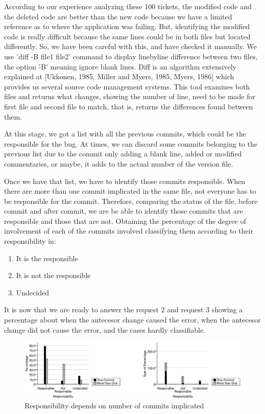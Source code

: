 \documentclass[a4paper]{article}
\begin{document}
According to our experience analyzing these 100 tickets, the modified code and the deleted code are better than the new code because we have a limited reference as to where the application was failing. But, identifying the modified code is really difficult because the same lines could be in both files but located differently. So, we have been careful with this, and have checked it manually. We use 'diff -B file1 file2' command to display line\-by\-line difference between two files, the option \'-B' meaning ignore blank lines.  Diff is an algorithm extensively explained at [Ukkonen, 1985, Miller and Myers, 1985, Myers, 1986]  which provides us several source code management systems. This tool examines both files and returns  what changes, showing the number of line, need to be made for first file and second file to match, that is, returns the differences found between them.

At this stage, we got a list with all the previous commits, which could be the responsible  for the bug. At times, we can discard some commits belonging to the previous list due to the commit only adding a blank line, added or modified commentaries, or maybe, it adds to the actual number of the version file. 

Once we have that list, we have to identify those commits responsible. When there are more than one commit implicated in the same file, not everyone has to be responsible for the commit. Therefore, comparing the status of the file, before commit and after commit, we are be able to identify those commits that are responsible and those that are not. Obtaining the percentage of the degree of involvement of each of the commits involved  classifying them according to their responsibility in:

\begin{enumerate}
    \item It is the responsible
     \item It is not the responsible 
    \item Undecided
\end{enumerate}

It is now that we are ready to answer the request 2 and request 3 showing a percentage about when the antecesor change caused the error, when the antecesor change did not cause the error, and the cases hardly classifiable. 

\begin{figure}[htb]
\centering
\includegraphics[width=1\textwidth]{secondStage}
\caption{Responsibility depends on number of commits implicated} \label{fig:secondStage}
\end{figure}
\end{document}
